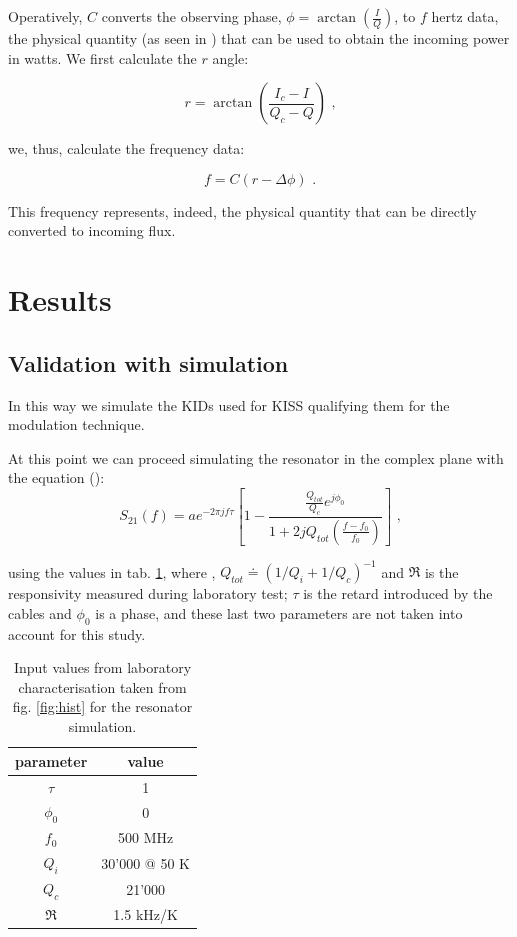 \documentclass[twocolumn,traditabstract]{aa}\\
\begin{document}
\noindent Operatively, $C$ converts the observing phase, $\phi=\arctan\left( \frac{I}{Q} \right)$, to $f$ hertz data, the physical quantity (as seen in \cite{Swenson}) that can be used to obtain the incoming power in watts. We first calculate the $r$ angle:


\begin{equation}
r = \arctan \left( \frac{I_c - I}{Q_c - Q} \right)  \text{ ,}
\end{equation}

\noindent we, thus, calculate the frequency data:

\begin{equation}
f = C (r-\Delta\phi) \text{ .}
\end{equation}

\noindent This frequency represents, indeed, the physical quantity that can be directly converted to incoming flux.


\section{Results}
\label{sec:results}

\subsection{Validation with simulation}

\noindent In this way we simulate the KIDs used for KISS qualifying them for the modulation technique. 

\noindent At this point we can proceed simulating the resonator in the complex plane with the equation (\cite{Gao}):
\begin{equation}
S_{21}(f)=ae^{-2\pi j f \tau} \left[ 1-\frac{\frac{Q_{tot}}{Q_c}e^{j\phi_0}}{1+2jQ_{tot}\left(\frac{f-f_0}{f_0}\right)}\right] \text{ ,}
\label{eq:s21_IQ}
\end{equation}

\noindent using the values in tab. \ref{tab:s21_values}, where , $Q_{tot}\doteq\left( 1/Q_i + 1/Q_c \right)^{-1}$ and $\mathfrak{R}$ is the responsivity measured during laboratory test; $\tau$ is the retard introduced by the cables and $\phi_0$ is a phase, and these last two parameters are not taken into account for this study.

\begin{table}[htf]
	\footnotesize
	\centering
	\caption{Input values from laboratory characterisation taken from fig. \ref{fig:hist} for the resonator simulation.}
	\begin{tabular}{cc}
		\toprule
		\textbf{parameter} & \textbf{value} \\
		\toprule
		$\tau$ & 1 \\ 
		\midrule 
		$\phi_0$ & 0 \\
		\midrule
		$f_0$ & 500 MHz \\  
		\midrule 
		$Q_i$ & 30'000 @ 50 K \\ 
		\midrule 
		$Q_c$ & 21'000 \\ 
		\midrule 
		$\mathfrak{R}$  & 1.5 kHz/K \\ 
		\bottomrule
	\end{tabular}
	\label{tab:s21_values}
\end{table}
\end{document}
